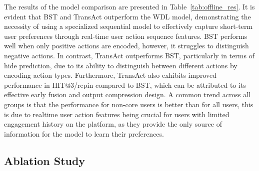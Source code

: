 The results of the model comparison are presented in Table~\ref{tab:offline_res}. It is evident that BST and TransAct outperform the WDL model, demonstrating the necessity of using a specialized sequential model to effectively capture short-term user preferences through real-time user action sequence features. 
BST performs well when only positive actions are encoded, however, it struggles to distinguish negative actions. 
In contrast, TransAct outperforms BST, particularly in terms of hide prediction, due to its ability to distinguish between different actions by encoding action types. 
Furthermore, TransAct also exhibits improved performance in HIT@3/repin compared to BST, which can be attributed to its effective early fusion and output compression design. 
A common trend across all groups is that the performance for non-core users is better than for all users, this is due to realtime user action features being crucial for users with limited engagement history on the platform, as they provide the only source of information for the model to learn their preferences.
\subsection{Ablation Study}



